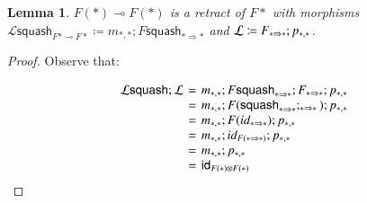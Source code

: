 \documentclass{article}
\newtheorem{lemma}[theorem]{Lemma}
\let\split\relax
\newcommand{\cat}[1]{\mathcal{#1}}
\newcommand{\id}[0]{\mathsf{id}}
\newcommand{\lolli}{\multimap}
\newcommand{\split}[0]{\mathsf{split}}
\newcommand{\squash}[0]{\mathsf{squash}}
\begin{document}
\begin{lemma}
  $F(\ast) \lolli F(\ast)$ is a retract of $F\ast$ with morphisms $\cat{L}\squash_{F\ast \lolli F\ast} \coloneqq m_{\ast,\ast} ; F \squash_{\ast \Rightarrow \ast}$ and $\cat{L}\split \coloneqq  F \split_{\ast \Rightarrow \ast} ; p_{\ast,\ast} $.
\end{lemma}
\begin{proof}
  Observe that:

  \[
  \setlength{\arraycolsep}{2px}
  \begin{array}{lll}
    \cat{L}\squash ; \cat{L}\split
    & = & m_{\ast,\ast} ; F \squash_{\ast \Rightarrow \ast} ; F \split_{\ast \Rightarrow \ast} ; p_{\ast,\ast} \\
    & = & m_{\ast,\ast} ; F(\squash_{\ast \Rightarrow \ast} ; \split_{\ast \Rightarrow \ast}) ; p_{\ast, \ast} \\
    & = & m_{\ast,\ast} ; F(id_{\ast \Rightarrow \ast}) ; p_{\ast, \ast} \\
    & = & m_{\ast, \ast} ; id_{F(\ast \Rightarrow \ast)} ; p_{\ast, \ast} \\
    & = & m_{\ast, \ast} ; p_{\ast, \ast} \\
    & = & \id_{F(\ast) \otimes F(\ast)}
  \end{array}
  \]

\end{proof}
\vspace{-15px}

\nocite{*}


\end{document}

